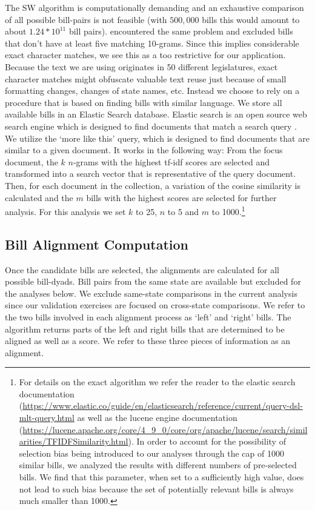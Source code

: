 \documentclass[12pt]{article} %
\begin{document}
The SW algorithm is computationally demanding and an exhaustive comparison of
all possible bill-pairs is not feasible (with $500,000$ bills this would amount
to about $1.24 * 10^11$ bill pairs). \citet{wilkerson2015tracing} encountered the same problem and excluded bills that don't have at least five matching 10-grams. Since this implies considerable exact character matches, we see this as a too restrictive for our application. Because the text we are using originates in 50 different legislatures, exact character matches might obfuscate valuable text reuse just because of small formatting changes, changes of state names, etc. 
Instead we choose to rely on a procedure that is based on finding bills with
similar language. We store all available bills in an Elastic Search database.
Elastic search is an open source web search engine which is designed to find
documents that match a search query \citep{gormley2015elasticsearch}. We utilize
the `more like this' query, which is designed to find documents that are similar
to a given document. It works in the following way: From the focus document, the
$k$ $n$-grams with the highest tf-idf scores are selected and transformed into a
search vector that is representative of the query document. Then, for each
document in the collection, a variation of the cosine similarity is calculated
and the $m$ bills with the highest scores are selected for further analysis. For
this analysis we set $k$ to 25, $n$ to 5 and $m$ to 1000.\footnote{For
details on the exact algorithm we refer the reader to the elastic search
documentation
(\url{https://www.elastic.co/guide/en/elasticsearch/reference/current/query-dsl-mlt-query.html} as well as the lucene engine
documentation
(\url{https://lucene.apache.org/core/4_9_0/core/org/apache/lucene/search/similarities/TFIDFSimilarity.html}).
In order to account for the possibility of selection bias being introduced to
our analyses through the cap of 1000 similar bills, we analyzed the results with
different numbers of pre-selected bills. We find that this parameter, when set
to a sufficiently high value, does not lead to such bias because the set of
potentially relevant bills is always much smaller than 1000.}


\subsection{Bill Alignment Computation}

Once the candidate bills are selected, the alignments are calculated for all
possible bill-dyads. Bill pairs from the same state are available but excluded
for the analyses below. We exclude same-state comparisons in the current
analysis since our validation exercises are focused on cross-state comparisons.
We refer to the two bills involved in each alignment process as `left' and
`right' bills. The algorithm returns parts of the left and right bills that are determined to be aligned as well as a score. We refer to these three pieces of information as an alignment. 
\end{document}
